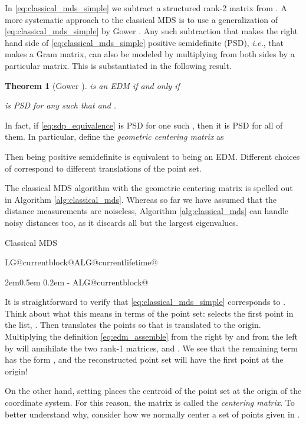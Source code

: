 \documentclass[10pt,double]{IEEEtran}
\makeatletter
\newtheorem{thm}{Theorem}
\newcommand{\rev}[1]{{#1}}
\newlength{\continueindent}
\renewenvironment{algorithmic}[1][0]{\edef\ALG@numberfreq{#1}\def\@currentlabel{\theALG@line}\setcounter{ALG@line}{0}\setcounter{ALG@rem}{0}\let\\\algbreak \expandafter\edef\csname ALG@currentblock@\theALG@nested\endcsname{0}\expandafter\let\csname ALG@currentlifetime@\theALG@nested\endcsname\relax \begin{list}{\ALG@step}{\rightmargin\z@ \itemsep\z@ \itemindent\z@ \listparindent2em\partopsep\z@ \parskip\z@ \parsep\z@ \labelsep 0.5em \topsep 0.2em\ifthenelse{\equal{#1}{0}}{\labelwidth 0.5em}{\labelwidth 1.2em}\leftmargin\labelwidth \addtolength{\leftmargin}{\labelsep}
      \ALG@tlm\z@ }\parshape 2 \leftmargin \linewidth \continueindent \dimexpr\linewidth-\continueindent\relax
   \setcounter{ALG@nested}{0}\ALG@beginalgorithmic }{\ALG@closeloops \expandafter\ifnum\csname ALG@currentblock@\theALG@nested\endcsname=0\relax \else \PackageError{algorithmicx}{Some blocks are not closed!!!}{}\fi \ALG@endalgorithmic \end{list}}\makeatother
\makeatother
\begin{document}
In \eqref{eq:classical_mds_simple} we subtract a structured rank-2 matrix
 from . A more systematic approach to
the classical MDS is to use a generalization of
\eqref{eq:classical_mds_simple} by Gower
\cite{gower1982}. Any such subtraction that makes the right hand side of
\eqref{eq:classical_mds_simple} positive semidefinite (PSD), \emph{i.e.}, that
makes  a Gram matrix, can also be modeled by multiplying  from both
sides by a particular matrix. This is substantiated in the following result.

\begin{thm}[Gower \cite{gower1982}]
\label{thm:sdp_equivalence}
 is an EDM if and only if

is PSD for any  such that  and .
\end{thm}
In fact, if \eqref{eq:sdp_equivalence} is PSD for one such , then it is
PSD for all of them. In particular, define the \emph{geometric centering
matrix} as

Then  being positive semidefinite is equivalent to
 being an EDM. Different choices of  correspond to different
translations of the point set. 

The classical MDS algorithm with the geometric centering matrix is spelled out
in Algorithm \ref{alg:classical_mds}. \rev{Whereas so far we have assumed that
the distance measurements are noiseless, Algorithm \ref{alg:classical_mds} can
handle noisy distances too, as it discards all but the  largest
eigenvalues.}

\begin{algorithm}[t]
\caption{Classical MDS}
\label{alg:classical_mds}
\begin{algorithmic}[1]
	\State  {}
	\State  {}
\State 
	\State \Return{}
\EndFunction
\end{algorithmic}
\end{algorithm}

It is straightforward to verify that \eqref{eq:classical_mds_simple}
corresponds to . Think about what this means in terms of the
point set:  selects the first point in the list, . Then
 translates the points so that  is
translated to the origin. Multiplying the definition \eqref{eq:edm_assemble}
from the right by  and from the left by  will annihilate the two rank-1 matrices,  and
. We see that the remaining term has the form , and the reconstructed point set will have the first point at
the origin!

On the other hand, setting  places the centroid of
the point set at the origin of the coordinate system. For this reason, the
matrix  is called the \emph{centering matrix}. To better
understand why, consider how we normally center a set of points given in
. 
\end{document}
